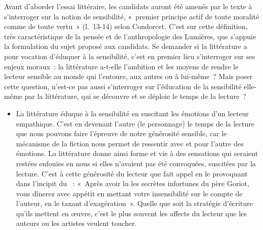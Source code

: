		{Avant d'aborder l'essai littéraire, les candidats auront été amenés par le texte à
s'interroger sur la notion de sensibilité, «~premier principe actif de toute moralité
comme de toute vertu~» (l.~13-14) selon Condorcet. C'est sur cette définition, très
caractéristique de la pensée et de l'anthropologie des Lumières, que s'appuie la
formulation du sujet proposé aux candidats. Se demander si la littérature a pour
vocation d'éduquer à la sensibilité, c'est en premier lieu s'interroger sur ses enjeux
moraux~: la littérature a-t-elle l'ambition et les moyens de rendre le lecteur sensible au
monde qui l'entoure, aux autres ou à lui-même~? Mais poser cette question, n'est-ce
pas aussi s'interroger sur l'éducation de la sensibilité elle-même par la littérature, qui
se découvre et se déploie le temps de la lecture~?

\begin{itemize}
\item La littérature éduque à la sensibilité en suscitant les émotions d'un lecteur
empathique. C'est en devenant l'autre (le personnage) le temps de la lecture que
nous pouvons faire l'épreuve de notre générosité sensible, car le mécanisme de la
fiction nous permet de ressentir avec et pour l'autre des émotions. La littérature
donne ainsi forme et vie à des sensations qui seraient restées enfouies en nous si
elles n'avaient pas été convoquées, suscitées par la lecture. C'est à cette
générosité du lecteur que  fait appel en le provoquant dans l'incipit du ~: «~Après avoir lu les secrètes infortunes du père Goriot, vous dînerez avec
appétit en mettant votre insensibilité sur le compte de l'auteur, en le taxant
d'exagération~». Quelle que soit la stratégie d'écriture qu'ils mettent en œuvre, c'est
le plus souvent les affects du lecteur que les auteurs ou les artistes veulent toucher.


\end{itemize}}
